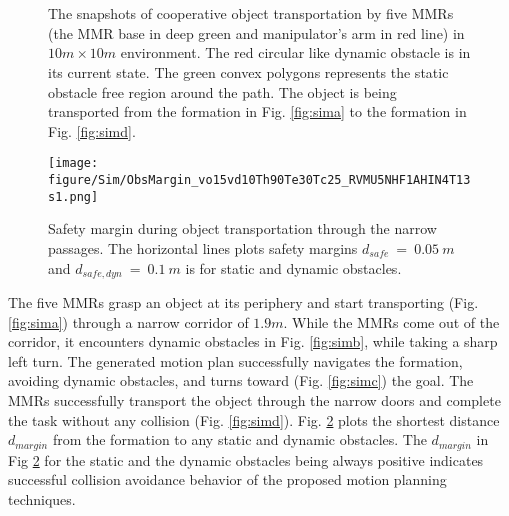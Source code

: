 \begin{figure}[htbp]
	\\
	\\
	\caption{The snapshots of cooperative object transportation by five MMRs (the MMR base in deep green and manipulator's arm in red line) in $10m\times10m$ environment. The red circular like dynamic obstacle is in its current state. The green convex polygons represents the static obstacle free region around the path. The object is being transported from the formation in Fig. \ref{fig:sima} to the formation in Fig. \ref{fig:simd}.}
	\label{fig:Sim}
\end{figure}

\begin{figure}[htbp]
	\centerline{\texttt{[image: figure/Sim/ObsMargin\_vo15vd10Th90Te30Tc25\_RVMU5NHF1AHIN4T13s1.png]}}
	\caption{Safety margin during object transportation through the narrow passages. The horizontal lines plots safety margins $d_{safe}\ =\ 0.05\ m$ and $d_{safe,dyn}\ =\ 0.1\ m$ is for static and dynamic obstacles.}
	\label{fig:SafetyMargin}
\end{figure}

The five MMRs grasp an object at its periphery and start transporting (Fig. \ref{fig:sima}) through a narrow corridor of $1.9m$. While the MMRs come out of the corridor, it encounters dynamic obstacles in Fig. \ref{fig:simb}, while taking a sharp left turn. The generated motion plan successfully navigates the formation, avoiding dynamic obstacles, and turns toward (Fig. \ref{fig:simc}) the goal. The MMRs successfully transport the object through the narrow doors and complete the task without any collision (Fig. \ref{fig:simd}). Fig. \ref{fig:SafetyMargin} plots the shortest distance $d_{margin}$ from the formation to any static and dynamic obstacles. The $d_{margin}$ in Fig \ref{fig:SafetyMargin} for the static and the dynamic obstacles being always positive indicates successful collision avoidance behavior of the proposed motion planning techniques.

